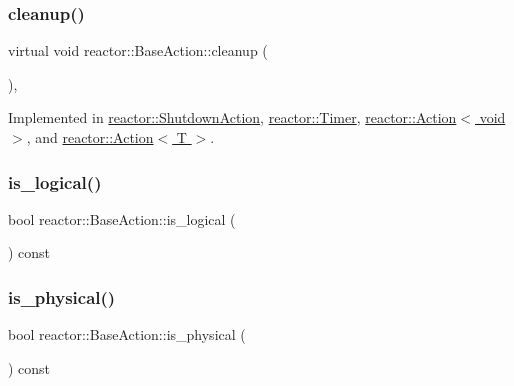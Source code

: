 \subsubsection{\texorpdfstring{cleanup()}{cleanup()}}
{\footnotesize\ttfamily virtual void reactor\+::\+Base\+Action\+::cleanup (\begin{DoxyParamCaption}{ }\end{DoxyParamCaption})\hspace{0.3cm}{\ttfamily [protected]}, {}}



Implemented in \hyperlink{classreactor_1_1ShutdownAction_acbea47c7b7efb26cd10d6ac8c781901a}{reactor\+::\+Shutdown\+Action}, \hyperlink{classreactor_1_1Timer_ab01356b0c99de6a3bd9f46bfd0ce1c7b}{reactor\+::\+Timer}, \hyperlink{classreactor_1_1Action_3_01void_01_4_aa0306b1c370b15a324bac607e5f82f20}{reactor\+::\+Action$<$ void $>$}, and \hyperlink{classreactor_1_1Action_a4ae275c1b030d5e8111469cc0ca5e09d}{reactor\+::\+Action$<$ T $>$}.

\mbox{\label{classreactor_1_1BaseAction_abff8e7a40679e9f0d6d31eb795530279}} 
\subsubsection{\texorpdfstring{is\+\_\+logical()}{is\_logical()}}
{\footnotesize\ttfamily bool reactor\+::\+Base\+Action\+::is\+\_\+logical (\begin{DoxyParamCaption}{ }\end{DoxyParamCaption}) const\hspace{0.3cm}{\ttfamily [inline]}}

\mbox{\label{classreactor_1_1BaseAction_ae088220a837f00686793dd0a50629dc0}} 
\subsubsection{\texorpdfstring{is\+\_\+physical()}{is\_physical()}}
{\footnotesize\ttfamily bool reactor\+::\+Base\+Action\+::is\+\_\+physical (\begin{DoxyParamCaption}{ }\end{DoxyParamCaption}) const\hspace{0.3cm}{\ttfamily [inline]}}

